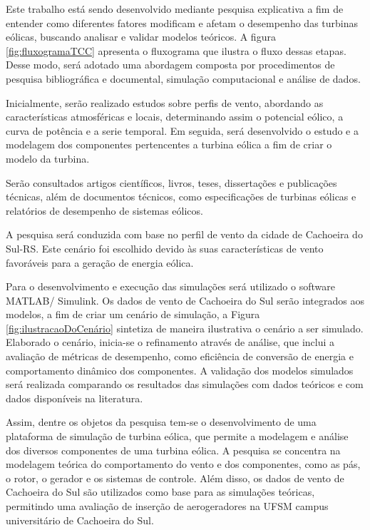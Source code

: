 

\par Este trabalho está sendo desenvolvido mediante pesquisa explicativa a fim de entender como diferentes fatores modificam e afetam o desempenho das turbinas eólicas, buscando analisar e validar modelos teóricos. A figura \ref{fig:fluxogramaTCC} apresenta o fluxograma que ilustra o fluxo dessas etapas.  Desse modo, será adotado uma abordagem composta por procedimentos de pesquisa bibliográfica e documental, simulação computacional e análise de dados. 
\par Inicialmente, serão realizado estudos sobre perfis de vento, abordando as características atmosféricas e locais, determinando assim o potencial eólico, a curva de potência e a serie temporal. Em seguida, será desenvolvido o estudo e a modelagem dos componentes pertencentes a turbina eólica a fim de criar o modelo da turbina. 
\par Serão consultados artigos científicos, livros, teses, dissertações e publicações técnicas, além de documentos técnicos, como especificações de turbinas eólicas e relatórios de desempenho de sistemas eólicos.
\par A pesquisa será conduzida com base no perfil de vento da cidade de Cachoeira do Sul-RS. Este cenário foi escolhido devido às suas características de vento favoráveis para a geração de energia eólica.
\par Para o desenvolvimento e execução das simulações será utilizado o software MATLAB/ Simulink. Os dados de vento de Cachoeira do Sul serão integrados aos modelos, a fim de criar um cenário de simulação, a Figura \ref{fig:ilustracaoDoCenário} sintetiza de maneira ilustrativa o cenário a ser simulado. Elaborado o cenário, inicia-se o refinamento através de análise, que inclui a avaliação de métricas de desempenho, como eficiência de conversão de energia e comportamento dinâmico dos componentes. A validação dos modelos simulados será realizada comparando os resultados das simulações com dados teóricos e com dados disponíveis na literatura. 




\par Assim, dentre os objetos da pesquisa tem-se o desenvolvimento de uma plataforma de simulação de turbina eólica, que permite a modelagem e análise dos diversos componentes de uma turbina eólica. A pesquisa se concentra na modelagem teórica do comportamento do vento e dos componentes, como as pás, o rotor, o gerador e os sistemas de controle. Além disso, os dados de vento de Cachoeira do Sul são utilizados como base para as simulações teóricas, permitindo uma avaliação de inserção de aerogeradores na UFSM campus universitário de Cachoeira do Sul.


